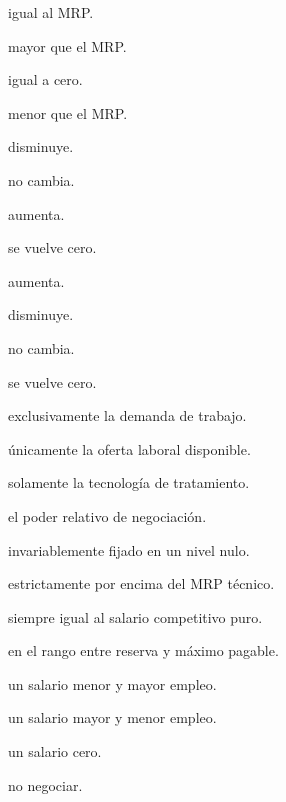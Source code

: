 \begin{opts}
    \item igual al MRP.
    \item mayor que el MRP.
    \item igual a cero.
    \item menor que el MRP.
\end{opts}

\begin{opts}
    \item disminuye.
    \item no cambia.
    \item aumenta.
    \item se vuelve cero.
\end{opts}

\begin{opts}
    \item aumenta.
    \item disminuye.
    \item no cambia.
    \item se vuelve cero.
\end{opts}

\begin{opts}
    \item exclusivamente la demanda de trabajo.
    \item únicamente la oferta laboral disponible.
    \item solamente la tecnología de tratamiento.
    \item el poder relativo de negociación.
\end{opts}

\begin{opts}
    \item invariablemente fijado en un nivel nulo.
    \item estrictamente por encima del MRP técnico.
    \item siempre igual al salario competitivo puro.
    \item en el rango entre reserva y máximo pagable.
\end{opts}

\begin{opts}
    \item un salario menor y mayor empleo.
    \item un salario mayor y menor empleo.
    \item un salario cero.
    \item no negociar.
\end{opts}

